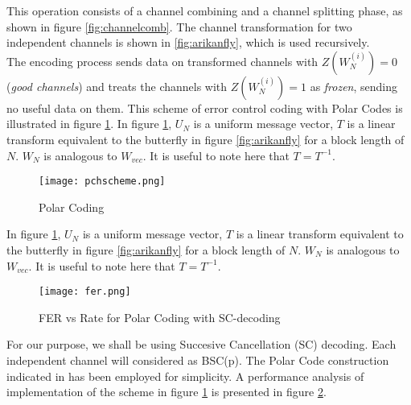 \documentclass[
11pt, %
a4paper, %
oneside, %
headinclude,footinclude, %
BCOR5mm, %
]{scrartcl}
\begin{document}
This operation consists of a channel combining and a channel splitting phase, as shown in figure \ref{fig:channelcomb}. The channel transformation for two independent channels is shown in \ref{fig:arikanfly}, which is used recursively. \\The encoding process sends data on transformed channels with $Z(W^{(i)}_N)=0$  (\emph{good channels}) and treats the channels with $Z(W^{(i)}_N)=1$ as \emph{frozen}, sending no useful data on them. This scheme of error control coding with Polar Codes is illustrated in figure \ref{fig:pchscheme}.
In figure \ref{fig:pchscheme}, $U_N$ is a uniform message vector, $T$ is a linear transform equivalent to the butterfly in figure \ref{fig:arikanfly} for a block length of $N$. $W_N$ is analogous to $W_{vec}$. It is useful to note here that $T=T^{-1}$.
\begin{figure}[h!]
 \begin{center}
    \texttt{[image: pchscheme.png]}
  \end{center}
  \caption{Polar Coding}
  \label{fig:pchscheme}
\end{figure}
In figure \ref{fig:pchscheme}, $U_N$ is a uniform message vector, $T$ is a linear transform equivalent to the butterfly in figure \ref{fig:arikanfly} for a block length of $N$. $W_N$ is analogous to $W_{vec}$. It is useful to note here that $T=T^{-1}$.
\begin{figure}[h!]
  \begin{center}
    \texttt{[image: fer.png]}
  \end{center}
  \caption{FER vs Rate for Polar Coding with SC-decoding}
  \label{fig:fer}
\end{figure}
For our purpose, we shall be using Succesive Cancellation (SC) decoding. Each independent channel will considered as BSC(p). The Polar Code construction indicated in \cite{zhang} has been employed for simplicity. A performance analysis of implementation of the scheme in figure \ref{fig:pchscheme} is presented in figure \ref{fig:fer}.   
\end{document}
